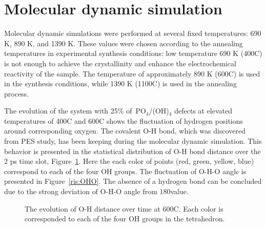 \section{Molecular dynamic simulation}

Molecular dynamic simulations were performed at several fixed temperatures: 690 K, 890 K, and 1390 K. These values were chosen according to the annealing temperatures in experimental synthesis conditions: low temperature 690 K (400\textdegree C) is not enough to achieve the crystallinity and enhance the electrochemical reactivity of the sample. The temperature of approximately 890 K (600\textdegree C) is used in the synthesis conditions, while 1390 K (1100\textdegree C) is used in the annealing process. 

The evolution of the system with 25\% of~PO$_4$/(OH)$_4$ defects at elevated temperatures of 400\textdegree C and 600\textdegree C shows the fluctuation of hydrogen positions around corresponding oxygen. The covalent O-H bond, which was discovered from PES study, has been keeping during the molecular dynamic simulation. This behavior is presented in the statistical distribution of O-H bond distance over the 2 ps time slot, Figure~\ref{ris:OH}. Here the each color of points (red, green, yellow, blue) correspond to each of the four OH groups.
The fluctuation of O-H-O angle is presented in Figure~\ref{ris:OHO}. The absence of a hydrogen bond can be concluded due to the strong deviation of O-H-O angle from 180\textdegree value. 

\begin{figure}[h]
\caption{The evolution of O-H distance over time at 600\textdegree C. Each color is corresponded to each of the four OH groups in the tetrahedron.}
\label{ris:OH}
\end{figure}


